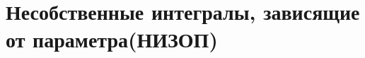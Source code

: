\documentclass[../main.tex]{subfiles}
\begin{document}
 \chapter{Несобственные интегралы, зависящие от параметра(НИЗОП)}
 
\end{document}
